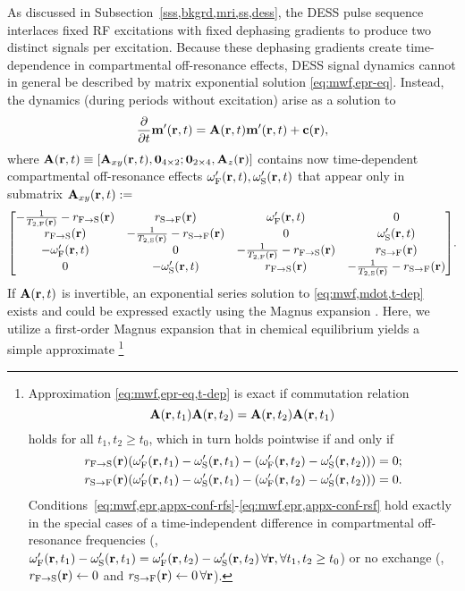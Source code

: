 As discussed
in Subsection~\ref{sss,bkgrd,mri,ss,dess},
the DESS pulse sequence interlaces fixed RF excitations
with fixed dephasing gradients
to produce two distinct signals
per excitation.
Because these dephasing gradients
create time-dependence
in compartmental off-resonance effects,
DESS signal dynamics
cannot in general be described
by matrix exponential solution \eqref{eq:mwf,epr-eq}.
Instead, 
the dynamics (during periods without excitation) 
arise as a solution to
\begin{align}
	\dela{t} \bmmp\prt = \bmA\prt \bmmp\prt + \bmc\pr,
	\label{eq:mwf,mdot,t-dep}
\end{align}
where
$\bmA\prt \equiv \brac{\bmAxy\prt, \zeros{4 \times 2};
\zeros{2 \times 4}, \bmAz\pr}$
contains now time-dependent compartmental off-resonance effects
$\ompf\prt, \omps\prt$
that appear only in submatrix
$\bmAxy\prt :=$
\begin{align}
	\begin{bmatrix}
		-\frac{1}{\tf{2}\pr}-\rfs\pr & \rsf\pr & \ompf\prt & 0 \\
		\rfs\pr & -\frac{1}{\ts{2}\pr}-\rsf\pr & 0 & \omps\prt \\
		-\ompf\prt & 0 & -\frac{1}{\tf{2}\pr}-\rfs\pr & \rsf\pr \\
		0 & -\omps\prt & \rfs\pr & -\frac{1}{\ts{2}\pr}-\rsf\pr
	\end{bmatrix}.
	\label{eq:mwf,Axy-t-dep}
\end{align}
If $\bmA\prt$ is invertible,
an exponential series solution
to \eqref{eq:mwf,mdot,t-dep} exists
and could be expressed exactly
using the Magnus expansion \cite{magnus:54:ote}. 
Here, 
we utilize a first-order Magnus expansion 
that in chemical equilibrium yields
a simple approximate 
\footnote{Approximation \eqref{eq:mwf,epr-eq,t-dep} is exact 
	if commutation relation
	$$\bmA\paren{\bmr,t_1}\bmA\paren{\bmr,t_2} = \bmA\paren{\bmr,t_2} \bmA\paren{\bmr,t_1}$$
	holds for all $t_1,t_2 \geq t_0$,
	which in turn holds pointwise if and only if
	\begin{align}
  	\rfs\pr \paren{\ompf\paren{\bmr,t_1} - \omps\paren{\bmr,t_1} -
  		\paren{\ompf\paren{\bmr,t_2} - \omps\paren{\bmr,t_2}}} &= 0;
  		\label{eq:mwf,epr,appx-conf-rfs} \\
  	\rsf\pr \paren{\ompf\paren{\bmr,t_1} - \omps\paren{\bmr,t_1} -
  		\paren{\ompf\paren{\bmr,t_2} - \omps\paren{\bmr,t_2}}} &= 0.
  		\label{eq:mwf,epr,appx-conf-rsf}
  \end{align}
  Conditions~\eqref{eq:mwf,epr,appx-conf-rfs}-\eqref{eq:mwf,epr,appx-conf-rsf} hold exactly
  in the special cases 
  of a time-independent difference 
  in compartmental off-resonance frequencies
  (\ie, $\ompf\paren{\bmr,t_1} - \omps\paren{\bmr,t_1} =
  	\ompf\paren{\bmr,t_2} - \omps\paren{\bmr,t_2}\, 
		\forall \bmr, \forall t_1,t_2 \geq t_0$)
  or no exchange 
  (\ie, $\rfs\pr \gets 0$ and $\rsf\pr  \gets 0\,
  	\forall \bmr$).
}
